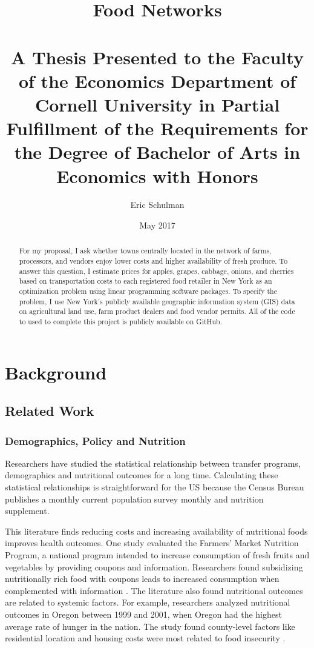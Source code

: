 \documentclass{report}
\title{Food Networks\\~\\ \normalsize A Thesis Presented to the Faculty of the Economics Department of Cornell University in Partial Fulfillment of the Requirements for the Degree of Bachelor of Arts in Economics with Honors}
\subtitle{}
\author{Eric Schulman}
\date{May 2017}
\begin{document}
\maketitle

\tableofcontents

\pagebreak

\begin{abstract}
For my proposal, I ask whether towns centrally located in the network of farms, processors, and vendors enjoy lower costs and higher availability of fresh produce. To answer this question, I estimate prices for apples, grapes, cabbage, onions, and cherries based on transportation costs to each registered food retailer in New York as an optimization problem using linear programming software packages. To specify the problem, I use New York's publicly available geographic information system (GIS) data on agricultural land use, farm product dealers and food vendor permits. All of the code to used to complete this project is publicly available on GitHub.
\end{abstract}


\chapter{Background}

\section{Related Work}
\subsection{Demographics, Policy and Nutrition}
Researchers have studied the statistical relationship between transfer programs, demographics and nutritional outcomes for a long time. Calculating these statistical relationships is straightforward for the US because the Census Bureau publishes a monthly current population survey monthly and nutrition supplement. 

This literature finds reducing costs and increasing availability of nutritional foods improves health outcomes. One study evaluated the Farmers' Market Nutrition Program, a national program intended to increase consumption of fresh fruits and vegetables by providing coupons and information. Researchers found subsidizing nutritionally rich food with coupons leads to increased consumption when complemented with information \cite{Just}. The literature also found nutritional outcomes are related to systemic factors. For example, researchers analyzed nutritional outcomes in Oregon between 1999 and 2001, when Oregon had the highest average rate of hunger in the nation. The study found county-level factors like residential location and housing costs were most related to food insecurity \cite{Bernell}. 
\end{document}
